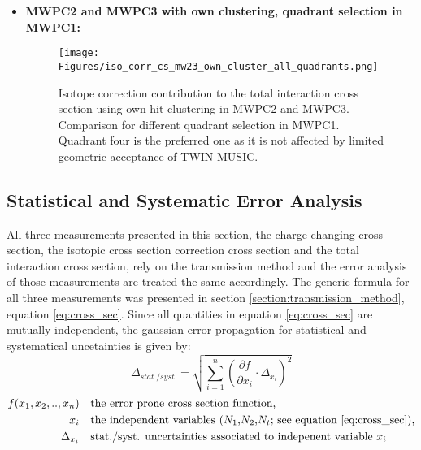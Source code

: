 \begin{itemize}
\item \textbf{MWPC2 and MWPC3 with own clustering, quadrant selection in MWPC1:}\newline
\begin{figure}[h!]
    \centering
    \texttt{[image: Figures/iso\_corr\_cs\_mw23\_own\_cluster\_all\_quadrants.png]}
    \caption{
	Isotope correction contribution to the total interaction cross section using own  hit clustering in MWPC2 and MWPC3. Comparison for different quadrant selection in MWPC1. Quadrant four is the preferred one as it is not affected by limited geometric acceptance of TWIN MUSIC.
     }
    \label{fig:iso_corr_quadrants_own_cluster}
\end{figure}

\end{itemize}

\newpage
\subsection{Statistical and Systematic Error Analysis}
All three measurements presented in this section, the charge changing cross section, the isotopic cross section correction cross section and the total interaction cross section, rely on the transmission method and the error analysis of those measurements are treated the same accordingly. The generic formula for all three measurements was presented in section \ref{section:transmission_method}, equation \ref{eq:cross_sec}.\newline
Since all quantities in equation \ref{eq:cross_sec} are mutually independent, the gaussian error propagation for statistical and systematical uncetainties is given by:
\begin{equation}
\Delta_{stat./syst.}  = \sqrt{\sum_{i=1}^n \left( \frac{\partial f}{\partial x_i} \cdot \Delta_{x_i} \right)^2 }
\end{equation}
\begin{align*}
	f(x_1,x_2,..,x_n) &\quad \text{the error prone cross section function,} \\
	x_i  &\quad \text{the independent variables ($N_1$,$N_2$,$N_t$; see equation \ref{eq:cross_sec}),} \\
	\Delta_{x_i} &\quad \text{stat./syst. uncertainties associated to indepenent variable $x_i$}
\end{align*}



